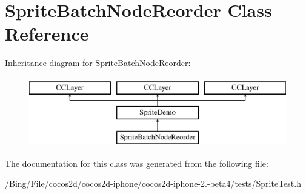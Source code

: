\hypertarget{interface_sprite_batch_node_reorder}{\section{Sprite\-Batch\-Node\-Reorder Class Reference}
\label{interface_sprite_batch_node_reorder}
}
Inheritance diagram for Sprite\-Batch\-Node\-Reorder\-:\begin{figure}[H]
\begin{center}
\leavevmode
\includegraphics[height=3.000000cm]{interface_sprite_batch_node_reorder}
\end{center}
\end{figure}


The documentation for this class was generated from the following file\-:\begin{DoxyCompactItemize}
\item 
/\-Bing/\-File/cocos2d/cocos2d-\/iphone/cocos2d-\/iphone-\/2.-\/beta4/tests/Sprite\-Test.\-h\end{DoxyCompactItemize}
